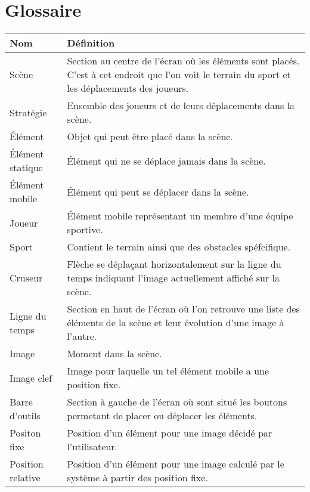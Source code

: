 \chapter{Glossaire}
\label{s:glossaire}

\begin{tabular}{|l|l|}
	\hline
	Nom & Définition \\
	\hline
	Scène 				& Section au centre de l'écran où les éléments sont placés. C'est à cet endroit que l'on voit le terrain du sport et les déplacements des joueurs. \\
	Stratégie  			& Ensemble des joueurs et de leurs déplacements dans la scène. \\
	Élément 			& Objet qui peut être placé dans la scène. \\
	Élément statique 	& Élément qui ne se déplace jamais dans la scène. \\
	Élément mobile 		& Élément qui peut se déplacer dans la scène. \\
	Joueur				& Élément mobile représentant un membre d'une équipe sportive. \\
	Sport				& Contient le terrain ainsi que des obstacles spéfcifique. \\
	Cruseur 			& Flèche se déplaçant horizontalement sur la ligne du temps indiquant l'image actuellement affiché sur la scène. \\
	Ligne du temps 		& Section en haut de l'écran où l'on retrouve une liste des éléments de la scène et leur évolution d'une image à l'autre. \\
	Image				& Moment dans la scène. \\
	Image clef			& Image pour laquelle un tel élément mobile a une position fixe. \\
	Barre d'outils 		& Section à gauche de l'écran où sont situé les boutons permetant de placer ou déplacer les éléments. \\
	Positon fixe		& Position d'un élément pour une image décidé par l'utilisateur. \\
	Position relative	& Position d'un élément pour une image calculé par le système à partir des position fixe.  \\
	\hline
\end{tabular}
